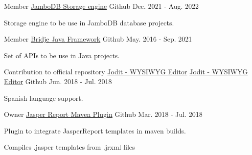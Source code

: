 
\begin{cventries}

  \cventry
    {Member} %
    {\href{https://github.com/jambodb/jambodb-storage}{JamboDB Storage engine}} %
    {\faGithubSquare\acvHeaderIconSep Github} %
    {Dec. 2021 - Aug. 2022} %
    {
      \begin{cvitems} %
        \item {Storage engine to be use in JamboDB database projects.}
      \end{cvitems}
    }

  \cventry
    {Member} %
    {\href{https://github.com/touwolf/bridje-framework}{Bridje Java Framework}} %
    {\faGithubSquare\acvHeaderIconSep Github} %
    {May. 2016 - Sep. 2021} %
    {
      \begin{cvitems} %
        \item {Set of APIs to be use in Java projects.}
      \end{cvitems}
    }

  \cventry
    {Contribution to official repository \href{https://github.com/xdan/jodit}{Jodit - WYSIWYG Editor}} %
    {\href{https://github.com/zp1ke/jodit}{Jodit - WYSIWYG Editor}} %
    {\faGithubSquare\acvHeaderIconSep Github} %
    {Jun. 2018 - Jul. 2018} %
    {
      \begin{cvitems} %
        \item {Spanish language support.}
      \end{cvitems}
    }

  \cventry
    {Owner} %
    {\href{https://github.com/zp1ke/jasperreport-maven-plugin}{Jasper Report Maven Plugin}} %
    {\faGithubSquare\acvHeaderIconSep Github} %
    {Mar. 2018 - Jul. 2018} %
    {
      \begin{cvitems} %
        \item {Plugin to integrate JasperReport templates in maven builds.}
        \item {Compiles .jasper templates from .jrxml files}
      \end{cvitems}
    }


\end{cventries}
